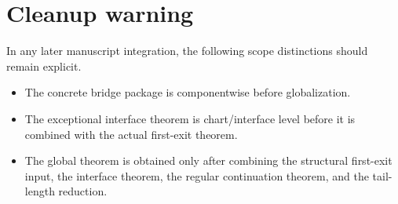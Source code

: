 \documentclass[11pt]{article}
\begin{document}
\section{Cleanup warning}

In any later manuscript integration, the following scope distinctions should
remain explicit.

\begin{itemize}[leftmargin=2em]
\item The concrete bridge package is componentwise before globalization.
\item The exceptional interface theorem is chart/interface level before it is
combined with the actual first-exit theorem.
\item The global theorem is obtained only after combining the structural
first-exit input, the interface theorem, the regular continuation theorem, and
the tail-length reduction.
\end{itemize}
\end{document}

